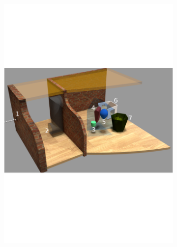 \documentclass[12pt,a4]{article}
\begin{document}
\begin{figure}[ht!]
\begin{subfigure}{0.3\textwidth}
    \end{subfigure}%
\\
~\\
        \begin{subfigure}{0.3\textwidth}
        \centering
        \includegraphics[width=1\linewidth]{figures/figscene.png}


\end{subfigure}
\end{figure}
\end{document}
